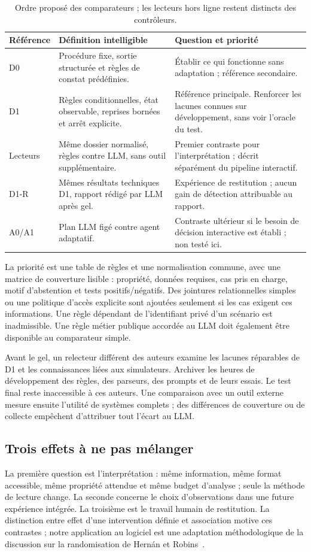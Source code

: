 \documentclass[11pt,a4paper]{article}
\begin{document}
\begin{table}[htbp]
\caption{Ordre proposé des comparateurs ; les lecteurs hors ligne restent distincts des contrôleurs.}
\label{tab:arms}
\small
\begin{tabularx}{\linewidth}{@{}p{.13\linewidth}Y Y@{}}
\toprule
Référence & Définition intelligible & Question et priorité \\
\midrule
D0 & Procédure fixe, sortie structurée et règles de constat prédéfinies. & Établir ce qui fonctionne sans adaptation ; référence secondaire. \\
D1 & Règles conditionnelles, état observable, reprises bornées et arrêt explicite. & Référence principale. Renforcer les lacunes connues sur développement, sans voir l'oracle du test. \\
Lecteurs & Même dossier normalisé, règles contre LLM, sans outil supplémentaire. & Premier contraste pour l'interprétation ; décrit séparément du pipeline interactif. \\
D1-R & Mêmes résultats techniques D1, rapport rédigé par LLM après gel. & Expérience de restitution ; aucun gain de détection attribuable au rapport. \\
A0/A1 & Plan LLM figé contre agent adaptatif. & Contraste ultérieur si le besoin de décision interactive est établi ; non testé ici. \\
\bottomrule
\end{tabularx}
\end{table}

La priorité est une table de règles et une normalisation commune, avec une
matrice de couverture lisible : propriété, données requises, cas pris en charge,
motif d'abstention et tests positifs/négatifs. Des jointures relationnelles
simples ou une politique d'accès explicite sont ajoutées seulement si les
cas exigent ces informations. Une règle dépendant de l'identifiant privé d'un
scénario est inadmissible. Une règle métier publique accordée au LLM doit
également être disponible au comparateur simple.

Avant le gel, un relecteur différent des auteurs examine les lacunes réparables
de D1 et les connaissances liées aux simulateurs. Archiver les heures de
développement des règles, des parseurs, des prompts et de leurs essais. Le
test final reste inaccessible à ces auteurs. Une comparaison avec un outil
externe mesure ensuite l'utilité de systèmes complets ; des différences de
couverture ou de collecte empêchent d'attribuer tout l'écart au LLM.

\subsection{Trois effets à ne pas mélanger}
La première question est l'interprétation : même information, même format
accessible, même propriété attendue et même budget d'analyse ; seule la méthode
de lecture change. La seconde concerne le choix d'observations dans une future
expérience intégrée. La troisième est le travail humain de restitution.
La distinction entre effet d'une intervention définie et association motive
ces contrastes ; notre application au logiciel est une adaptation méthodologique
de la discussion sur la randomisation de Hernán et Robins~\cite{hernan}.
\end{document}
